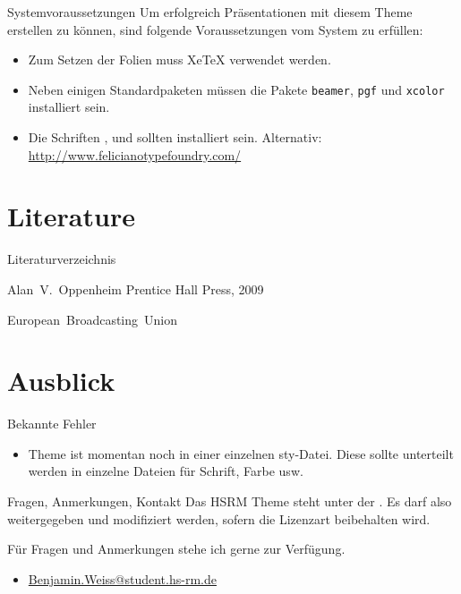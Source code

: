 \begin{frame}{Systemvoraussetzungen}
	Um erfolgreich Präsentationen mit diesem Theme erstellen zu können, sind folgende Voraussetzungen vom System zu erfüllen:
	\begin{itemize}
		\item Zum Setzen der Folien muss XeTeX verwendet werden.
		\item Neben einigen Standardpaketen müssen die Pakete \texttt{beamer}, \texttt{pgf} und \texttt{xcolor} installiert sein.
		\item Die Schriften ,  und  sollten installiert sein. Alternativ: \\\url{http://www.felicianotypefoundry.com/}
	\end{itemize}
\end{frame}

\section{Literature}
\begin{frame}{Literaturverzeichnis}
	\begin{thebibliography}{10}
    
	\beamertemplatebookbibitems
	Alan~V.~Oppenheim
	\newblock {}
	\newblock Prentice Hall Press, 2009

	\beamertemplatearticlebibitems
	European~Broadcasting~Union
	\newblock {}
  \end{thebibliography}
\end{frame}

\section{Ausblick}
\begin{frame}{Bekannte Fehler}
	\begin{itemize}
		\item Theme ist momentan noch in einer einzelnen sty-Datei. Diese sollte unterteilt werden in einzelne Dateien für Schrift, Farbe usw.
	\end{itemize}
\end{frame}

\begin{frame}{Fragen, Anmerkungen, Kontakt}
	Das HSRM Theme steht unter der . Es darf also weitergegeben und modifiziert werden, sofern die Lizenzart beibehalten wird.
	
	Für Fragen und Anmerkungen stehe ich gerne zur Verfügung.
	\begin{itemize}
		\item \url{Benjamin.Weiss@student.hs-rm.de}
	\end{itemize}
\end{frame}
